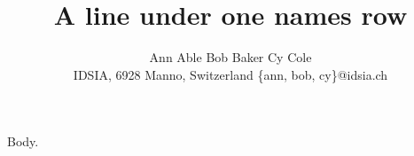 \documentclass{article}
\begin{document}
\title{A line under one names row}
\author{Ann Able \quad Bob Baker \quad Cy Cole\\
\small{IDSIA, 6928 Manno, Switzerland}
{\{ann, bob, cy\}@idsia.ch}}
\maketitle
Body.
\end{document}
